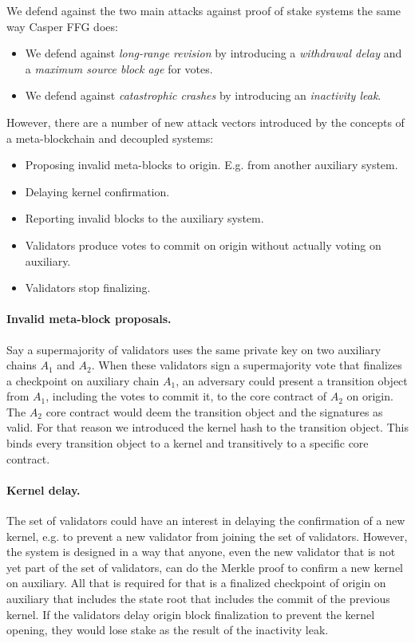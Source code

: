 \documentclass[12pt,a4paper]{article}
\begin{document}
We defend against the two main attacks against proof of stake systems the same way Casper FFG\cite{casperffg} does:
\begin{itemize}
    \item We defend against \emph{long-range revision} by introducing a \emph{withdrawal delay} and a \emph{maximum source block age} for votes.
    \item We defend against \emph{catastrophic crashes} by introducing an \emph{inactivity leak}.
\end{itemize}
However, there are a number of new attack vectors introduced by the concepts of a meta-blockchain and decoupled systems:
\begin{itemize}
    \item Proposing invalid meta-blocks to origin. E.g. from another auxiliary system.
    \item Delaying kernel confirmation.
    \item Reporting invalid blocks to the auxiliary system.
    \item Validators produce votes to commit on origin without actually voting on auxiliary.
    \item Validators stop finalizing.
\end{itemize}

\paragraph{Invalid meta-block proposals.}
Say a supermajority of validators uses the same private key on two auxiliary chains $A_1$ and $A_2$.
When these validators sign a supermajority vote that finalizes a checkpoint on auxiliary chain $A_1$, an adversary could present a transition object from $A_1$, including the votes to commit it, to the core contract of $A_2$ on origin.
The $A_2$ core contract would deem the transition object and the signatures as valid.
For that reason we introduced the kernel hash to the transition object.
This binds every transition object to a kernel and transitively to a specific core contract.

\paragraph{Kernel delay.}
The set of validators could have an interest in delaying the confirmation of a new kernel, e.g. to prevent a new validator from joining the set of validators.
However, the system is designed in a way that anyone, even the new validator that is not yet part of the set of validators, can do the Merkle proof to confirm a new kernel on auxiliary.
All that is required for that is a finalized checkpoint of origin on auxiliary that includes the state root that includes the commit of the previous kernel.
If the validators delay origin block finalization to prevent the kernel opening, they would lose stake as the result of the inactivity leak.
\end{document}
